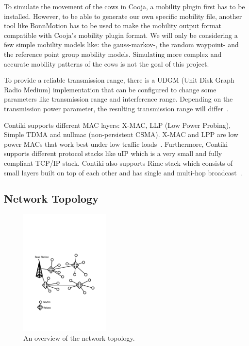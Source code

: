 \documentclass[conference]{IEEEtran}
\begin{document}
To simulate the movement of the cows in Cooja, a mobility plugin first has to
be installed. However, to be able to generate our own specific mobility file,
another tool like BonnMotion has to be used to make the mobility output format
compatible with Cooja’s mobility plugin format. We will only be considering
a few simple mobility models like: the gauss-markov-, the random waypoint- and
the reference point group mobility models. Simulating more complex and accurate
mobility patterns of the cows is not the goal of this project.

To provide a reliable transmission range, there is a UDGM (Unit Disk Graph
Radio Medium) implementation that can be configured to change some parameters
like transmission range and interference range. Depending on the transmission
power parameter, the resulting transmission range will
differ~\cite{contikidev}.

Contiki supports different MAC layers: X-MAC, LLP (Low Power Probing), Simple
TDMA and nullmac (non-persistent CSMA).  X-MAC and LPP are low power MACs that
work best under low traffic loads~\cite{coojacrash}.  Furthermore, Contiki
supports different protocol stacks like uIP which is a very small and fully
compliant TCP/IP stack. Contiki also supports Rime stack which consists of
small layers built on top of each other and has single and multi-hop
broadcast~\cite{coojacrash}.
\subsection{Network Topology}

\begin{figure}
    \centering
    \includegraphics[trim= 0 150  0 150, clip, width=0.4\textwidth]{Figure1.pdf}
    \caption{An overview of the network topology.}
    \label{fig:topology}
\end{figure}
\end{document}
